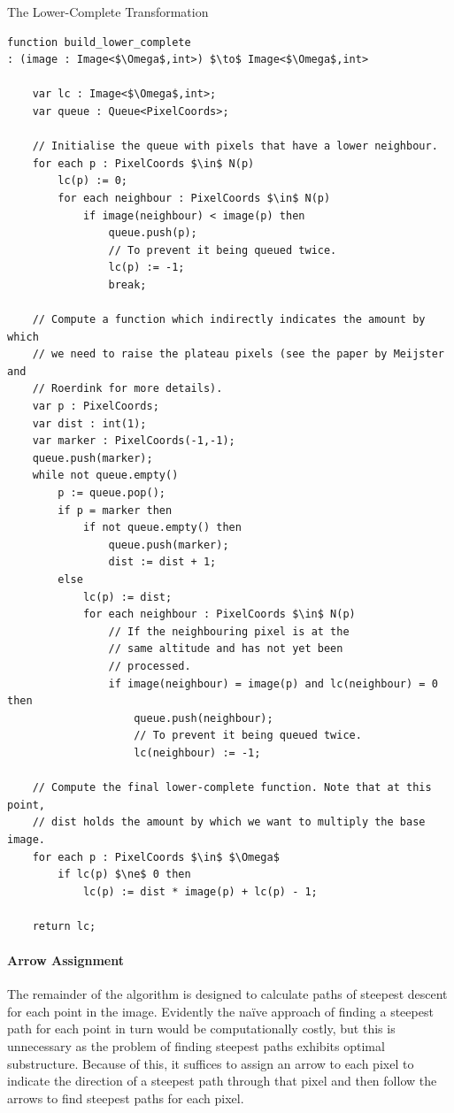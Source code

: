 \begin{stulisting}[p]
\caption{The Lower-Complete Transformation}
\label{code:segmentation-watershed-lowercomplete}
\begin{lstlisting}[style=Default]
function build_lower_complete
: (image : Image<$\Omega$,int>) $\to$ Image<$\Omega$,int>

	var lc : Image<$\Omega$,int>;
	var queue : Queue<PixelCoords>;

	// Initialise the queue with pixels that have a lower neighbour.
	for each p : PixelCoords $\in$ N(p)
		lc(p) := 0;
		for each neighbour : PixelCoords $\in$ N(p)
			if image(neighbour) < image(p) then
				queue.push(p);
				// To prevent it being queued twice.
				lc(p) := -1;
				break;

	// Compute a function which indirectly indicates the amount by which
	// we need to raise the plateau pixels (see the paper by Meijster and
	// Roerdink for more details).
	var p : PixelCoords;
	var dist : int(1);
	var marker : PixelCoords(-1,-1);
	queue.push(marker);
	while not queue.empty()
		p := queue.pop();
		if p = marker then
			if not queue.empty() then
				queue.push(marker);
				dist := dist + 1;
		else
			lc(p) := dist;
			for each neighbour : PixelCoords $\in$ N(p)
				// If the neighbouring pixel is at the
				// same altitude and has not yet been
				// processed.
				if image(neighbour) = image(p) and lc(neighbour) = 0 then
					queue.push(neighbour);
					// To prevent it being queued twice.
					lc(neighbour) := -1;
	
	// Compute the final lower-complete function. Note that at this point,
	// dist holds the amount by which we want to multiply the base image.
	for each p : PixelCoords $\in$ $\Omega$
		if lc(p) $\ne$ 0 then
			lc(p) := dist * image(p) + lc(p) - 1;

	return lc;
\end{lstlisting}
\end{stulisting}

\paragraph{Arrow Assignment}

The remainder of the algorithm is designed to calculate paths of steepest descent for each point in the image. Evidently the na\"ive approach of finding a steepest path for each point in turn would be computationally costly, but this is unnecessary as the problem of finding steepest paths exhibits optimal substructure. Because of this, it suffices to assign an arrow to each pixel to indicate the direction of a steepest path through that pixel and then follow the arrows to find steepest paths for each pixel.

